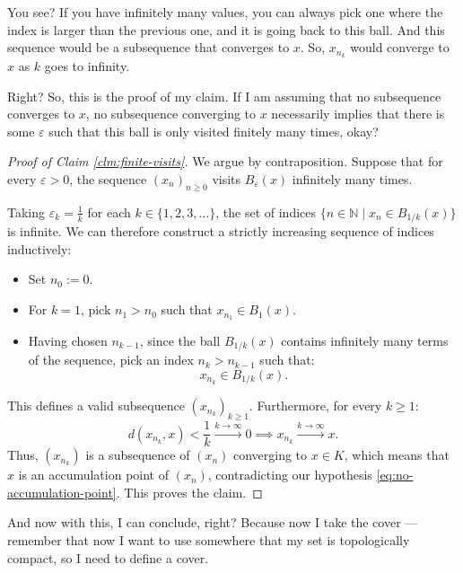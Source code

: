 \begin{proofWrapper}
\begin{speech}[00:14:00 - 00:16:25]
You see? If you have infinitely many values, you can always pick one where the index is larger than the previous one, and it is going back to this ball. And this sequence would be a subsequence that converges to $x$. So, $x_{n_k}$ would converge to $x$ as $k$ goes to infinity. 

Right? So, this is the proof of my claim. If I am assuming that no subsequence converges to $x$, no subsequence converging to $x$ necessarily implies that there is some $\varepsilon$ such that this ball is only visited finitely many times, okay?
\end{speech}

\begin{content}
\begin{proof}[Proof of Claim \ref{clm:finite-visits}]
We argue by contraposition. Suppose that for every $\varepsilon > 0$, the sequence $(x_n)_{n \ge 0}$ visits $B_\varepsilon(x)$ infinitely many times.

Taking $\varepsilon_k = \frac{1}{k}$ for each $k \in \{1, 2, 3, \dots\}$, the set of indices $\{n \in \mathbb{N} \mid x_n \in B_{1/k}(x)\}$ is infinite. We can therefore construct a strictly increasing sequence of indices inductively:
\begin{itemize}
    \item Set $n_0 := 0$.
    \item For $k = 1$, pick $n_1 > n_0$ such that $x_{n_1} \in B_{1}(x)$.
    \item Having chosen $n_{k-1}$, since the ball $B_{1/k}(x)$ contains infinitely many terms of the sequence, pick an index $n_k > n_{k-1}$ such that:
    \[
    x_{n_k} \in B_{1/k}(x).
    \]
\end{itemize}
This defines a valid subsequence $(x_{n_k})_{k \ge 1}$. Furthermore, for every $k \ge 1$:
\[
d(x_{n_k}, x) < \frac{1}{k} \xrightarrow{k \to \infty} 0 \implies x_{n_k} \xrightarrow{k \to \infty} x.
\]
Thus, $(x_{n_k})$ is a subsequence of $(x_n)$ converging to $x \in K$, which means that $x$ is an accumulation point of $(x_n)$, contradicting our hypothesis \eqref{eq:no-accumulation-point}. This proves the claim.
\end{proof}
\end{content}

\begin{speech}[00:16:25 - 00:19:00]
And now with this, I can conclude, right? Because now I take the cover --- remember that now I want to use somewhere that my set is topologically compact, so I need to define a cover.


\end{speech}
\end{proofWrapper}
